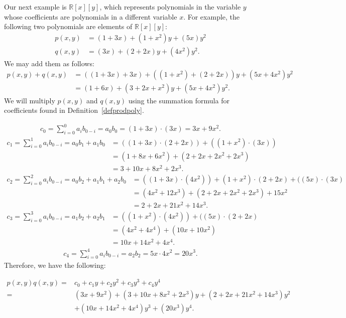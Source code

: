 Our next example is $\mathbb{R}[x][y]$, which represents polynomials in the variable $y$ whose coefficients are polynomials in a different variable $x$.  For example, the following two polynomials are elements of  $\mathbb{R}[x][y]$:
\begin{align*} 
p(x,y) & = (1+3x)+(1+x^2)y+(5x)y^2\\
q(x,y) & = (3x)+(2+2x)y+(4x^2)y^2.
\end{align*}
We may add them as follows:
\begin{align*}
p(x,y) + q(x,y) &=((1+3x)+3x)+((1+x^2)+(2+2x))y+(5x+4x^2)y^2\\
&= (1+6x)+(3+2x+x^2)y+(5x+4x^2 )y^2.
\end{align*}
We will multiply $p(x,y)$ and $q(x,y)$ using the summation formula for coefficients found in Definition~\ref{defprodpoly}.

\begin{align*}
 c_0 = \sum_{i = 0}^0 a_i b_{0 - i} = a_0b_0= (1+3x) \cdot (3x)= 3x+9x^2. 
\end{align*}
\begin{align*}
 c_1 = \sum_{i = 0}^1 a_i b_{0 - i} = a_0b_1+a_1b_0&= ((1+3x) \cdot (2+2x))+((1+x^2)\cdot (3x))\\
&=(1+8x+6x^2)+(2+2x+2x^2+2x^3)\\
&=3+10x+8x^2+2x^3. 
\end{align*}
\begin{align*}
 c_2 = \sum_{i = 0}^2 a_i b_{0 - i} = a_0b_2+a_1b_1+a_2b_0&=((1+3x) \cdot (4x^2))+(1+x^2)\cdot(2+2x)+((5x)\cdot(3x)\\
&= (4x^2+12x^3)+(2+2x+2x^2+2x^3)+15x^2\\
&=2+2x+21x^2+14x^3. 
\end{align*}
\begin{align*}
c_3 = \sum_{i = 0}^3 a_i b_{0 - i} = a_1b_2+a_2b_1&= ((1+x^2) \cdot (4x^2))+((5x)\cdot(2+2x)\\
&=  (4x^2+4x^4)+(10x+10x^2)\\
&=10x+14x^2+4x^4. 
\end{align*}
\begin{align*}
 c_4 = \sum_{i = 0}^4 a_i b_{0 - i} = a_2b_2= 5x \cdot 4x^2= 20x^3. 
\end{align*}
Therefore, we have the following:

\begin{align*}
p(x,y)q(x,y)=& c_0+c_1y+c_2y^2+c_3y^3+c_4y^4\\
=&(3x+9x^2)+(3+10x+8x^2+2x^3)y+(2+2x+21x^2+14x^3)y^2\\
&+(10x+14x^2+4x^4)y^3+(20x^3)y^4.
\end{align*}

